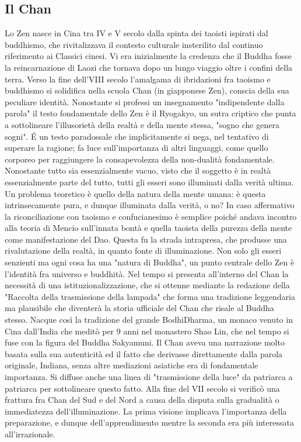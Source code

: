 \documentclass[10pt,a4paper]{report}
\begin{document}
\subsection{Il Chan}
Lo Zen nasce in Cina tra IV e V secolo dalla spinta dei taoisti ispirati dal buddhismo, che rivitalizzava il contesto culturale insterilito dal continuo riferimento ai Classici cinesi. Vi era inizialmente la credenza che il Buddha fosse la reincarnazione di Laozi che tornava dopo un lungo viaggio oltre i confini della terra. Verso la fine dell'VIII secolo l'amalgama di ibridazioni fra taoismo e buddhismo si solidifica nella scuola Chan (in giapponese Zen), conscia della sua peculiare identità. Nonostante si professi un insegnamento "indipendente dalla parola" il testo fondamentale dello Zen è il Ryogakyo, un sutra criptico che punta a sottolineare l'illusorietà della realtà e della mente stessa, "sogno che genera sogni". \'E un testo paradossale che implicitamente si nega, nel tentativo di superare la ragione; fa luce sull'importanza di altri linguaggi, come quello corporeo per raggiungere la consapevolezza della non-dualità fondamentale. Nonostante tutto sia essenzialmente vacuo, visto che il soggetto è in realtà essenzialmente parte del tutto, tutti gli esseri sono illuminati dalla verità ultima.\\
Un problema teoretico è quello della natura della mente umana: è questa intrinsecamente pura, e dunque illuminata dalla verità, o no? In caso affermativo la riconciliazione con taoismo e confucianesimo è semplice poiché andava incontro alla teoria di Mencio sull'innata bontà e quella taoista della purezza della mente come manifestazione del Dao. Questa fu la strada intrapresa, che produsse una rivalutazione della realtà, in quanto fonte di illuminazione. Non solo gli esseri senzienti ma ogni cosa ha una "natura di Buddha", un punto centrale dello Zen è l'identità fra universo e buddhità. Nel tempo si presenta all'interno del Chan la necessità di una istituzionalizzazione, che si ottenne mediante la redazione della "Raccolta della trasmissione della lampada" che forma una tradizione leggendaria ma plausibile che diventerà la storia ufficiale del Chan che risale al Buddha stesso. Nacque così la tradizione del grande BodhiDharma, un monaco venuto in Cina dall'India che meditò per 9 anni nel monastero Shao Lin, che nel tempo si fuse con la figura del Buddha Sakyamuni. Il Chan aveva una narrazione molto basata sulla sua autenticità ed il fatto che derivasse direttamente dalla parola originale, Indiana, senza altre mediazioni asiatiche era di fondamentale importanza. Si diffuse anche una linea di "trasmissione della luce" da patriarca a patriarca per sottolineare questo fatto. Alla fine del VII secolo si verificò una frattura fra Chan del Sud e del Nord a causa della disputa sulla gradualità o immediatezza dell'illuminazione. La prima visione implicava l'importanza della preparazione, e dunque dell'apprendimento mentre la seconda era più interessata all'irrazionale. 
\end{document}
